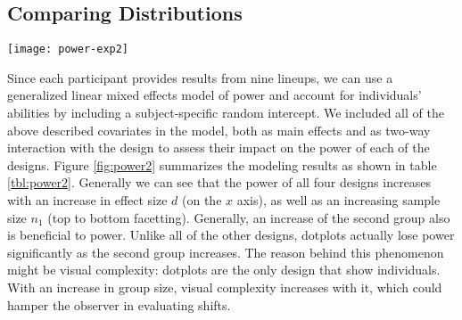 
\subsection{Comparing Distributions}
\begin{figure*}[htbp] %
   \centering
   \texttt{[image: power-exp2]} 
   \caption{Overview of power predictions for the four different designs. The fully saturated thick lines show average predicted power for each of the designs facetted by size of the red group (top to bottom) and relative size of the blue group to the red group (left to right). Thin lines represent variability due to subject-specific abilities. }
   \label{fig:power2}
\end{figure*}

Since each participant provides results from nine lineups, we can use a generalized linear mixed effects model of power and account for individuals' abilities by including a subject-specific random intercept. We included all of the above described covariates  in the model, both as main effects and as two-way interaction with the design to assess their impact on the power of each of the designs.
Figure \ref{fig:power2} summarizes the modeling results as shown in table \ref{tbl:power2}. Generally we can see that the power of all four designs increases with an increase in effect size $d$ (on the $x$ axis), as well as an increasing sample size $n_1$ (top to bottom facetting). Generally, an increase of the second group also is beneficial to power. Unlike all of the other designs,  dotplots actually lose power significantly as the second group increases. 
The reason behind this phenomenon might be visual complexity: dotplots are the only design that show individuals. With an increase in group size, visual complexity increases with it, which could hamper the observer in evaluating shifts.

